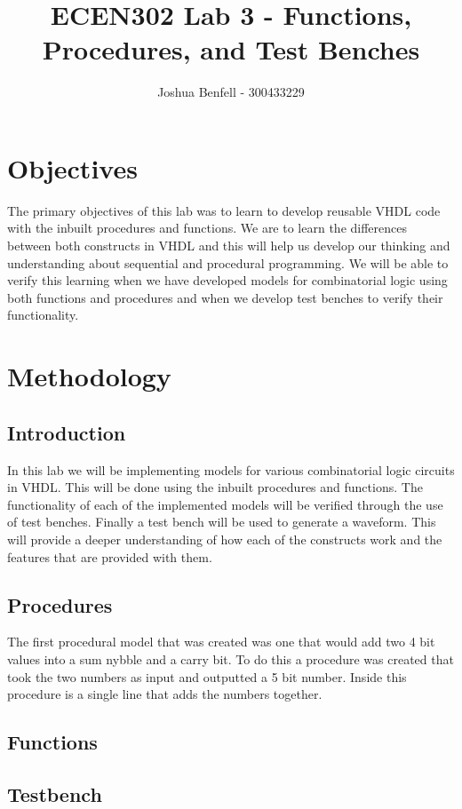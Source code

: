 \documentclass[a4paper, 12pt]{article}
\title{ECEN302 Lab 3 - Functions, Procedures, and Test Benches}
\author{Joshua Benfell - 300433229}
\begin{document}
	\maketitle
	
	\section{Objectives}
		The primary objectives of this lab was to learn to develop reusable VHDL code with the inbuilt procedures and functions. We are to learn the differences between both constructs in VHDL and this will help us develop our thinking and understanding about sequential and procedural programming. We will be able to verify this learning when we have developed models for combinatorial logic using both functions and procedures and when we develop test benches to verify their functionality.
	\section{Methodology}
		\subsection{Introduction}
			In this lab we will be implementing models for various combinatorial logic circuits in VHDL. This will be done using the inbuilt procedures and functions. The functionality of each of the implemented models will be verified through the use of test benches. Finally a test bench will be used to generate a waveform. This will provide a deeper understanding of how each of the constructs work and the features that are provided with them.
		\subsection{Procedures}
			The first procedural model that was created was one that would add two 4 bit values into a sum nybble and a carry bit. To do this a procedure was created that took the two numbers as input and outputted a 5 bit number. Inside this procedure is a single line that adds the numbers together.
		\subsection{Functions}
		
		\subsection{Testbench}
\end{document}
